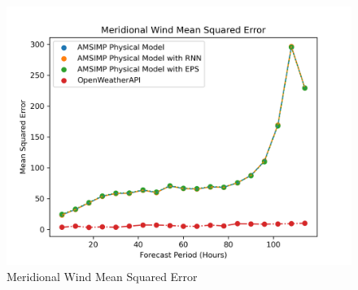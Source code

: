 \begin{figure}[H]
    \centering
    \includegraphics[width=.8\linewidth]{Graphs/accuracy/comparsion_openweatherapi/meridional_wind.png}
    \caption{Meridional Wind Mean Squared Error}
\end{figure}
